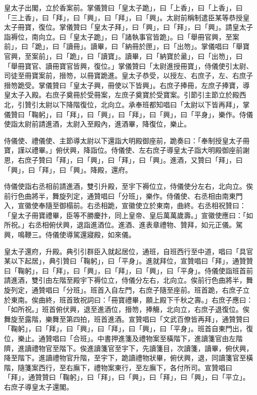 \begin{pinyinscope}
 皇太子出閣，立於香案前。掌儀贊曰「皇太子跪」，曰「上香」，曰「上香」，曰「三上香」，曰「拜」，曰「興」，曰「拜」，曰「興」。太尉前稱制遣臣某等恭授皇太子冊寶，復位。掌儀贊曰「皇太子拜」，曰「興」，曰「拜」，曰「興」。請皇太子詣褥位，南向立。曰「皇太子跪」，曰「諸執事官皆跪」。曰「舉冊官興，至案前」，曰「跪」，曰「讀冊」。讀畢，曰「納冊於匣」，曰「出笏」。掌儀唱曰「舉寶官興，至案前」，曰「跪」，曰「讀寶」。讀畢，曰「納寶於盝」，曰「出笏」，曰「舉冊寶官、讀冊寶官皆興，復位。」掌儀贊曰「太尉進授冊寶」，侍儀使引太尉、司徒至冊寶案前，搢笏，以冊寶跪進。皇太子恭受，以授左、右庶子，左、右庶子搢笏跪受。掌儀贊曰「皇太子興，冊使以下皆興」。右庶子捧冊，左庶子捧寶，導皇太子入殿。右庶子奠冊於受冊案，左庶子奠寶於受寶案。引節引主節立於殿西北，引贊引太尉以下降階復位，北向立。承奉班都知唱曰「太尉以下皆再拜」，掌儀贊曰「鞠躬」，曰「拜」，曰「興」，曰「拜」，曰「興」，曰「平身」，樂作。侍儀使詣太尉前請進酒，太尉入至殿內，進酒畢，降復位，樂止。



 侍儀使、禮儀使、主節導太尉以下還詣大明殿御座前，跪奏曰：「奉制授皇太子冊寶，謹以禮畢。」俯伏興，降詣位。侍儀使、左右庶子導皇太子詣大明殿御座前謝恩，右庶子贊曰「拜」，曰「興」，曰「拜」，曰「興」。進酒，又贊曰「拜」，曰「興」，曰「拜」，曰「興」。降殿，還府。



 侍儀使詣右丞相前請進酒，雙引升殿，至宇下褥位立，侍儀使分左右，北向立。俟前行色曲將半，舞旋列定，通贊唱曰「分班」，樂作。侍儀使、右丞相由南東門入，宣徽使奉隨至御榻前。右丞相跪，宣徽使立於東南，曲終。右丞相祝贊曰：「皇太子冊寶禮畢，臣等不勝慶抃，同上皇帝、皇后萬萬歲壽。」宣徽使應曰：「如所祝。」右丞相俯伏興，退詣進酒位。進酒、進表章禮物、贊拜，如元正儀。駕興，鳴鞭三。侍儀使導駕還寢殿，如來儀。



 皇太子還府，升殿。典引引群臣入就起居位，通班，自班西行至中道，唱曰「具官某以下起居」，典引贊曰「鞠躬」，曰「平身」。進就拜位，宣贊唱曰「拜」，通贊贊曰「鞠躬」，曰「拜」，曰「興」，曰「拜」，曰「興」，曰「平身」。侍儀使詣班首前請進酒，雙引由左階至殿宇下褥位立，侍儀分左右，北向立。俟前行色曲將半，舞旋列定，通贊唱曰「分班」。班首入自左門，右庶子隨至座前。班首跪，右庶子立於東南。俟曲終，班首致祝詞曰：「冊寶禮畢，願上殿下千秋之壽。」右庶子應曰：「如所祝。」班首俯伏興，退至進酒位，搢笏，捧觴，北向立，右庶子退復位。俟舞旋至露階，樂舞至第四拍，班首進酒。宣贊唱曰「文武百僚皆再拜」，通贊贊曰「鞠躬」，曰「拜」，曰「興」，曰「拜」，曰「興」，曰「平身」。班首自東門出，復位，樂止。通贊唱曰「合班」。中書押進箋及禮物案至橫階下，進讀箋官由左階隮，進讀禮物官至階下。俟進讀箋官至宇下，先讀箋目，次讀箋，讀畢，俯伏興，降至階下。進讀禮物官升階，至宇下，跪讀禮物狀畢，俯伏興，退，同讀箋官至橫階，隨箋案西行，至右廡下，禮物案東行，至左廡下，各付所司。宣贊唱曰「拜」，通贊贊曰「鞠躬」，曰「拜」，曰「興」，曰「拜」，曰「興」，曰「平立」。右庶子導皇太子還閣。




\end{pinyinscope}
